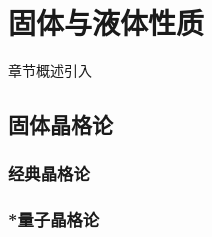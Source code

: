 \chapter{固体与液体性质}\label{12}

章节概述引入

\section{固体晶格论}\label{12-1}

\subsection{经典晶格论}\label{12-1-1}

\subsection{*量子晶格论}\label{12-1-2}
